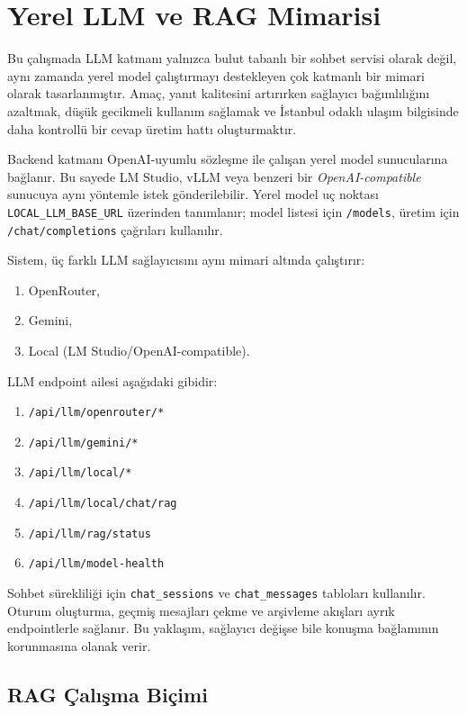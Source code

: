 ﻿\section{Yerel LLM ve RAG Mimarisi}

Bu çalışmada LLM katmanı yalnızca bulut tabanlı bir sohbet servisi olarak değil, aynı zamanda yerel model çalıştırmayı destekleyen çok katmanlı bir mimari olarak tasarlanmıştır. Amaç, yanıt kalitesini artırırken sağlayıcı bağımlılığını azaltmak, düşük gecikmeli kullanım sağlamak ve İstanbul odaklı ulaşım bilgisinde daha kontrollü bir cevap üretim hattı oluşturmaktır.

Backend katmanı OpenAI-uyumlu sözleşme ile çalışan yerel model sunucularına bağlanır. Bu sayede LM Studio, vLLM veya benzeri bir \textit{OpenAI-compatible} sunucuya aynı yöntemle istek gönderilebilir. Yerel model uç noktası \texttt{LOCAL\_LLM\_BASE\_URL} üzerinden tanımlanır; model listesi için \texttt{/models}, üretim için \texttt{/chat/completions} çağrıları kullanılır.

Sistem, üç farklı LLM sağlayıcısını aynı mimari altında çalıştırır:
\begin{enumerate}
    \item OpenRouter,
    \item Gemini,
    \item Local (LM Studio/OpenAI-compatible).
\end{enumerate}

LLM endpoint ailesi aşağıdaki gibidir:
\begin{enumerate}
    \item \texttt{/api/llm/openrouter/*}
    \item \texttt{/api/llm/gemini/*}
    \item \texttt{/api/llm/local/*}
    \item \texttt{/api/llm/local/chat/rag}
    \item \texttt{/api/llm/rag/status}
    \item \texttt{/api/llm/model-health}
\end{enumerate}

Sohbet sürekliliği için \texttt{chat\_sessions} ve \texttt{chat\_messages} tabloları kullanılır. Oturum oluşturma, geçmiş mesajları çekme ve arşivleme akışları ayrık endpointlerle sağlanır. Bu yaklaşım, sağlayıcı değişse bile konuşma bağlamının korunmasına olanak verir.

\subsection{RAG Çalışma Biçimi}

